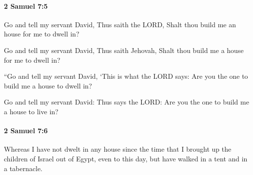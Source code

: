 		\paragraph{2 Samuel 7:5} %
			\label{2SAMUEL-7-5}

			Go and tell my servant David, Thus saith the LORD, Shalt thou build me an house for me to dwell in?

			\begin{versebox}
					\item[BHS] 
					\item[ASV] Go and tell my servant David, Thus saith Jehovah, Shalt thou build me a house for me to dwell in?
					\item[NIV] “Go and tell my servant David, ‘This is what the LORD says: Are you the one to build me a house to dwell in?
					\item[NRSV] Go and tell my servant David: Thus says the LORD: Are you the one to build me a house to live in?
			\end{versebox}

		\paragraph{2 Samuel 7:6} %
			\label{2SAMUEL-7-6}

			Whereas I have not dwelt in any house since the time that I brought up the children of Israel out of Egypt, even to this day, but have walked in a tent and in a tabernacle.

